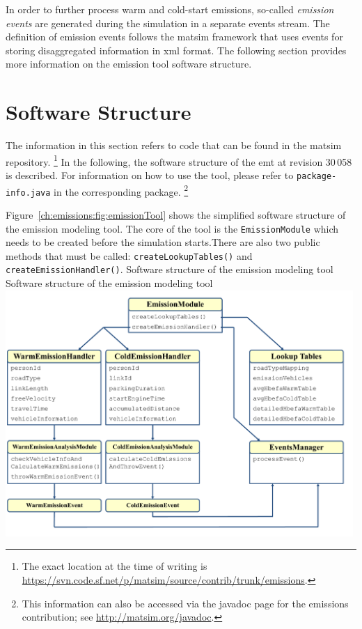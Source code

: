 In order to further process warm and cold-start emissions, so-called 
\emph{emission events} are generated during the simulation in a separate 
events stream. The definition of emission events follows the \gls{matsim} 
framework that uses events for storing disaggregated information in 
\gls{xml} format. The following section provides more information 
on the emission tool software structure.

\section{Software Structure}
\label{ch:emissions:structure}
The information in this section refers to code that can be found in the 
\gls{matsim} repository.%
%
\footnote{
%
The exact location at the time of writing is 
\url{https://svn.code.sf.net/p/matsim/source/contrib/trunk/emissions}.
%
}
In the following, the software structure of the \gls{emt} at 
revision 30\,058 is described. For information on how to use the tool, please 
refer to \lstinline|package-info.java| in the corresponding package.%
%
\footnote{
%
This information can also be accessed via the javadoc page for the emissions contribution; see \url{http://matsim.org/javadoc}.
%
}
%

Figure~\ref{ch:emissions:fig:emissionTool} shows the simplified software structure of the emission modeling tool. The core of the tool is the \lstinline|EmissionModule| which needs to be created before the simulation starts.There are also two public methods that must be called: \lstinline|createLookupTables()| and \lstinline|createEmissionHandler()|.
%
\createfigure%
{Software structure of the emission modeling tool}%
{Software structure of the emission modeling tool}%
{\label{ch:emissions:fig:emissionTool}}%
{\includegraphics[width=0.99\textwidth, angle=0]{extending/figures/emissionToolOverview_pdfa.pdf}}%
{}

